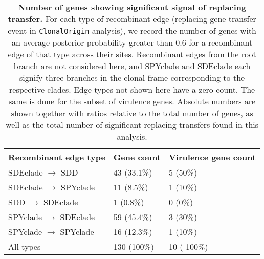 \documentclass[12pt]{article}
\providecommand{\tabularnewline}{\\}
\begin{document}
\begin{table}[!ht]
\caption{
{\bf Number of genes showing significant signal of replacing transfer.}  For
each type of recombinant edge (replacing gene transfer event in
\texttt{ClonalOrigin} analysis), we record the number of genes with an average
posterior probability greater than 0.6 for a recombinant edge of that type
across their sites. Recombinant edges from the root branch are not considered
here, and SPYclade and SDEclade each signify three branches in the clonal frame
corresponding to the respective clades. Edge types not shown here have a zero
count. The same is done for the subset of virulence genes. Absolute numbers are
shown together with ratios relative to the total number of genes, as well as the
total number of significant replacing transfers found in this analysis.}
\noindent \centering{}\begin{tabular}{lll}
\hline
Recombinant edge type & Gene count & Virulence gene count \tabularnewline
\hline
SDEclade $\rightarrow$ SDD & 43 (33.1\%) & 5 (50\%) \tabularnewline
SDEclade $\rightarrow$ SPYclade & 11 (8.5\%) & 1 (10\%) \tabularnewline
SDD $\rightarrow$ SDEclade & 1 (0.8\%)  & 0 (0\%) \tabularnewline
SPYclade $\rightarrow$ SDEclade & 59 (45.4\%) & 3 (30\%) \tabularnewline
SPYclade $\rightarrow$ SPYclade & 16 (12.3\%) & 1 (10\%) \tabularnewline
All types & 130  (100\%) & 10   ( 100\%)\tabularnewline
\hline
\end{tabular}
\label{tab:gene-counts-replacing}
\end{table}
\end{document}
